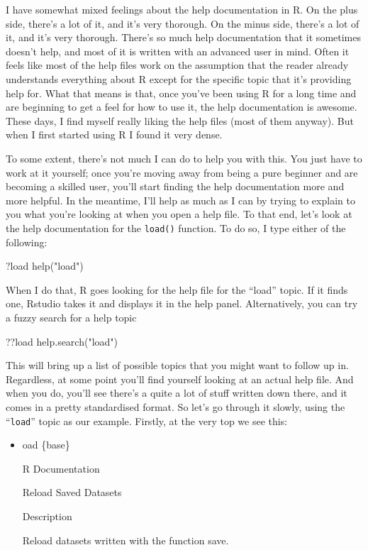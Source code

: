 \documentclass[
]{book}
\newenvironment{Shaded}{\begin{snugshade}}{\end{snugshade}}
\newcommand{\FunctionTok}[1]{\textcolor[rgb]{0.00,0.00,0.00}{#1}}
\newcommand{\NormalTok}[1]{#1}
\newcommand{\StringTok}[1]{\textcolor[rgb]{0.31,0.60,0.02}{#1}}
\newenvironment{rmdnote}
  {\begin{rmdblock}}
  {\end{rmdblock}}
\newenvironment{rmdblock}[1]
  {
  \begin{itemize}
  \renewcommand{\labelitemi}{
    \raisebox{-.7\height}[0pt][0pt]{
      {\setkeys{Gin}{width=3em,keepaspectratio}}
    }
  }
  \setlength{\fboxsep}{1em}
  \item
  }
  {
  \end{itemize}
  }
\begin{document}
I have somewhat mixed feelings about the help documentation in R. On the plus side, there's a lot of it, and it's very thorough. On the minus side, there's a lot of it, and it's very thorough. There's so much help documentation that it sometimes doesn't help, and most of it is written with an advanced user in mind. Often it feels like most of the help ﬁles work on the assumption that the reader already understands everything about R except for the speciﬁc topic that it's providing help for. What that means is that, once you've been using R for a long time and are beginning to get a feel for how to use it, the help documentation is awesome. These days, I ﬁnd myself really liking the help ﬁles (most of them anyway). But when I ﬁrst started using R I found it very dense.

To some extent, there's not much I can do to help you with this. You just have to work at it yourself; once you're moving away from being a pure beginner and are becoming a skilled user, you'll start ﬁnding the help documentation more and more helpful. In the meantime, I'll help as much as I can by trying to explain to you what you're looking at when you open a help ﬁle. To that end, let's look at the help documentation for the \texttt{load()} function. To do so, I type either of the following:

\begin{Shaded}
\begin{Highlighting}[]
\NormalTok{?load }
\FunctionTok{help}\NormalTok{(}\StringTok{"load"}\NormalTok{)}
\end{Highlighting}
\end{Shaded}

When I do that, R goes looking for the help ﬁle for the ``load'' topic. If it ﬁnds one, Rstudio takes it and displays it in the help panel. Alternatively, you can try a fuzzy search for a help topic

\begin{Shaded}
\begin{Highlighting}[]
\NormalTok{??load }
\FunctionTok{help.search}\NormalTok{(}\StringTok{"load"}\NormalTok{)}
\end{Highlighting}
\end{Shaded}

This will bring up a list of possible topics that you might want to follow up in. Regardless, at some point you'll ﬁnd yourself looking at an actual help ﬁle. And when you do, you'll see there's a quite a lot of stuﬀ written down there, and it comes in a pretty standardised format. So let's go through it slowly, using the ``\texttt{load}'' topic as our example. Firstly, at the very top we see this:
\begin{rmdnote}
load \{base\}

R Documentation

Reload Saved Datasets

Description

Reload datasets written with the function save.
\end{rmdnote}
\end{document}
